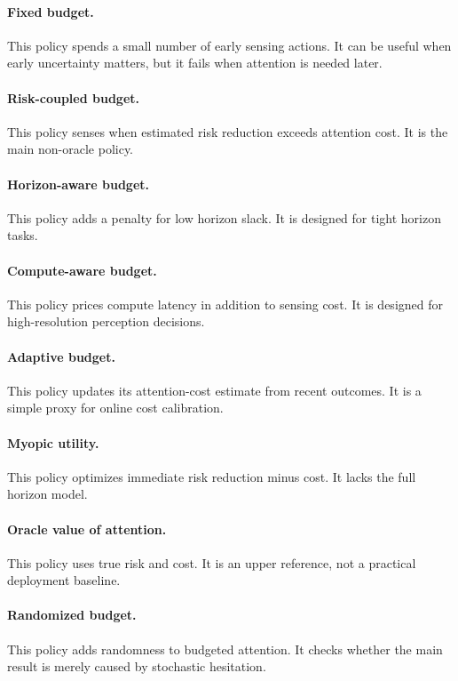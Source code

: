 \documentclass{article}
\begin{document}
\paragraph{Fixed budget.}
This policy spends a small number of early sensing actions. It can be useful
when early uncertainty matters, but it fails when attention is needed later.

\paragraph{Risk-coupled budget.}
This policy senses when estimated risk reduction exceeds attention cost. It is
the main non-oracle policy.

\paragraph{Horizon-aware budget.}
This policy adds a penalty for low horizon slack. It is designed for tight
horizon tasks.

\paragraph{Compute-aware budget.}
This policy prices compute latency in addition to sensing cost. It is designed
for high-resolution perception decisions.

\paragraph{Adaptive budget.}
This policy updates its attention-cost estimate from recent outcomes. It is a
simple proxy for online cost calibration.

\paragraph{Myopic utility.}
This policy optimizes immediate risk reduction minus cost. It lacks the full
horizon model.

\paragraph{Oracle value of attention.}
This policy uses true risk and cost. It is an upper reference, not a practical
deployment baseline.

\paragraph{Randomized budget.}
This policy adds randomness to budgeted attention. It checks whether the main
result is merely caused by stochastic hesitation.
\end{document}
